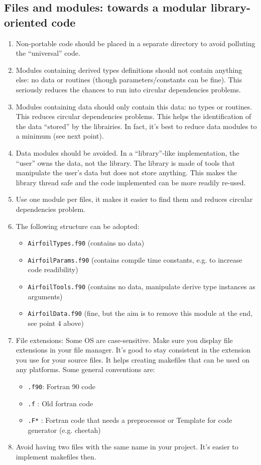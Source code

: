 \documentclass{article}
\begin{document}
\subsection{Files and modules: towards a modular library-oriented code}
\begin{enumerate}
    \item Non-portable code should be placed in a separate directory to avoid polluting the ``universal'' code.
    \item Modules containing derived types definitions should not contain anything else: no data or routines (though parameters/constants can be fine).  This seriously reduces the chances to run into circular dependencies problems. 
    \item Modules containing data should only contain this data: no types or routines. This reduces circular dependencies problems. This helps the identification of the data ``stored'' by the librairies. In fact, it's best to reduce data modules to a minimum (see next point).
    \item Data modules should be avoided. In a ``library''-like implementation, the ``user'' owns the data, not the library. The library is made of tools that manipulate the user's data but does not store anything. This makes the library thread safe and the code implemented can be more readily re-used.
    \item Use one module per files, it makes it easier to find them and reduces circular dependencies problem.
    \item The following structure can be adopted:
        \begin{itemize}
            \item \verb|AirfoilTypes.f90|  (contains no data)
            \item \verb|AirfoilParams.f90| (contains compile time constants, e.g. to increase code readibility)
            \item \verb|AirfoilTools.f90|  (contains no data, manipulate derive type instances as arguments)
            \item \verb|AirfoilData.f90| (fine, but the aim is to remove this module at the end, see point 4 above)
        \end{itemize}
    \item File extensions: Some OS are case-sensitive. Make sure you display file extensions in your file manager. It's good to stay consistent in the extension you use for your source files. It helps creating makefiles that can be used on any platforms. Some general conventions are:
        \begin{itemize}
            \item \verb|.f90|: Fortran 90 code
            \item \verb|.f|  : Old fortran code
            \item \verb|.F*|  : Fortran code that needs a preprocessor or Template for code generator (e.g. cheetah)
        \end{itemize}
    \item Avoid having two files with the same name in your project. It's easier to implement makefiles then.
\end{enumerate}
\end{document}
